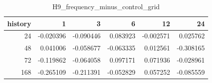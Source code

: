 \begin{table}
\caption{H9_frequency_minus_control_grid}
\label{tab:H9_frequency_minus_control_grid}
\begin{tabular}{rrrrrr}
\toprule
history & 1 & 3 & 6 & 12 & 24 \\
\midrule
24 & -0.020396 & -0.090446 & 0.083923 & -0.002571 & 0.025762 \\
48 & 0.041006 & -0.058677 & -0.063335 & 0.012561 & -0.308165 \\
72 & -0.119862 & -0.064058 & 0.097171 & 0.071936 & -0.028961 \\
168 & -0.265109 & -0.211391 & -0.052829 & 0.057252 & -0.085559 \\
\bottomrule
\end{tabular}
\end{table}
